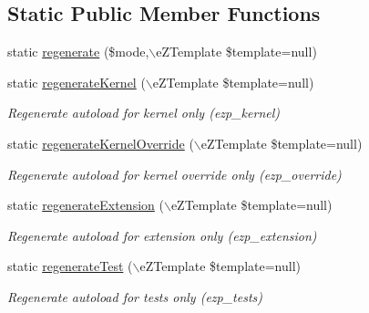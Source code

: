\subsection*{Static Public Member Functions}
\begin{DoxyCompactItemize}
\item 
static \hyperlink{classextension_1_1ezadvancedautoload_1_1classes_1_1helpers_1_1template_autoload_generator_helper_a9e7331253c8777a53e149cee0fec24e2}{regenerate} (\$mode,$\backslash$e\-Z\-Template \$template=null)
\item 
static \hyperlink{classextension_1_1ezadvancedautoload_1_1classes_1_1helpers_1_1template_autoload_generator_helper_a211ba9e5455710fff3650c6346bb25b2}{regenerate\-Kernel} ($\backslash$e\-Z\-Template \$template=null)
\begin{DoxyCompactList}\small\item\em Regenerate autoload for kernel only (ezp\-\_\-kernel) \end{DoxyCompactList}\item 
static \hyperlink{classextension_1_1ezadvancedautoload_1_1classes_1_1helpers_1_1template_autoload_generator_helper_a16974fee22eab241cc07d0cb204a1416}{regenerate\-Kernel\-Override} ($\backslash$e\-Z\-Template \$template=null)
\begin{DoxyCompactList}\small\item\em Regenerate autoload for kernel override only (ezp\-\_\-override) \end{DoxyCompactList}\item 
static \hyperlink{classextension_1_1ezadvancedautoload_1_1classes_1_1helpers_1_1template_autoload_generator_helper_a3d8b479039142fc9527828cc4e3e37b3}{regenerate\-Extension} ($\backslash$e\-Z\-Template \$template=null)
\begin{DoxyCompactList}\small\item\em Regenerate autoload for extension only (ezp\-\_\-extension) \end{DoxyCompactList}\item 
static \hyperlink{classextension_1_1ezadvancedautoload_1_1classes_1_1helpers_1_1template_autoload_generator_helper_a67ef43192f34d9f76711d37eeef46836}{regenerate\-Test} ($\backslash$e\-Z\-Template \$template=null)
\begin{DoxyCompactList}\small\item\em Regenerate autoload for tests only (ezp\-\_\-tests) \end{DoxyCompactList}\end{DoxyCompactItemize}

